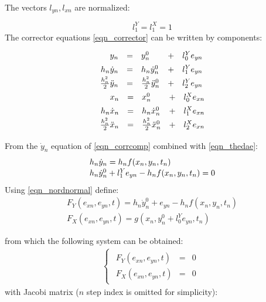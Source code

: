 \documentclass[lettersize,journal]{IEEEtran}
\begin{document}
The vectors \(l_{yn}, l_{xn}\) are normalized:

\begin{equation}
	\label{eqn_nordnormal}
		l^Y_1=l^X_1=1
\end{equation}
The corrector equations \eqref{eqn_corrector} can be written by components:
\begin{equation}
	\label{eqn_corrcomp}
	\def\arraystretch{1.4}
	\begin{array}{l}
		\begin{array}{rllll}
			y_n &= &y_n^0&+&l_0^Ye_{yn} \\
			h_n \dot{y}_n &=& h_n \dot{y}_n^0&+&l_1^Ye_{yn} \\
			\frac{h_n^2}{2}\ddot{y}_n &=& \frac{h_n^2}{2}\ddot{y}_n^0& + &l_2^Ye_{yn}
		\end{array}
		\\
		\begin{array}{rllll}
			x_n &= &x_n^0&+&l_0^Xe_{xn} \\
			h_n \dot{x}_n &=& h_n \dot{x}_n^0&+&l_1^Xe_{xn} \\
			\frac{h_n^2}{2}\ddot{x}_n &=& \frac{h_n^2}{2}\ddot{x}_n^0& + &l_2^Xe_{xn}
		\end{array}
	\end{array}
\end{equation}

From the \(\dot{y}_n\) equation of \eqref{eqn_corrcomp} combined with \eqref{eqn_thedae}:
\begin{equation}
	\label{eqn_corrdiff}
	\def\arraystretch{1.1}
	\begin{array}{l}
		h_n\dot{y}_n =  h_nf(x_n,y_n,t_n)\\
		h_n\dot{y}_n^0+l_1^Ye_{yn} - h_nf(x_n,y_n,t_n) = 0
	\end{array}
\end{equation}
Using \eqref{eqn_nordnormal} define:
\begin{equation}
	\label{eqn_define}
	\begin{array}{c}
		F_Y(e_{xn}, e_{yn}, t) = h_n\dot{y}_n^0+e_{yn}-h_nf(x_n, y_n, t_n) \\
		F_X(e_{xn}, e_{yn}, t) = g(x_n, y_n^0+l_0^Ye_{yn}, t_n)
	\end{array}
\end{equation}

\noindent from which the following system can be obtained:
\begin{equation}
	\label{eqn_system1}
	\begin{array}{c}
		\begin{cases}
			\begin{array}{rcl}
			F_Y(e_{xn}, e_{yn}, t) &=&0 \\
			F_X(e_{xn}, e_{yn}, t) &=&0 
			\end{array}
		\end{cases} 
	\end{array}
\end{equation}
\noindent with Jacobi matrix (\(n\) step index is omitted for simplicity):
\end{document}

